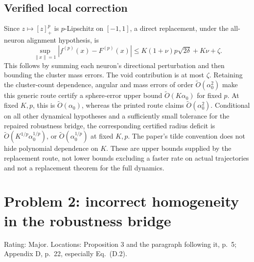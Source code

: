 \documentclass[10pt]{article}
\begin{document}
\subsection*{Verified local correction}
Since \(z\mapsto[z]_+^p\) is \(p\)-Lipschitz on \([-1,1]\), a direct replacement, under the all-neuron alignment hypothesis, is \[\sup_{\|x\|=1}|f^{(p)}(x)-F^{(p)}(x)|
 \le K(1+\nu)p\sqrt{2\delta}+K\nu+\zeta. \tag{R2}\] This follows by summing each neuron’s directional perturbation and then bounding the cluster mass errors. The void contribution is at most \(\zeta\). Retaining the cluster-count dependence, angular and mass errors of order \(\widetilde O(\alpha_0^2)\) make this generic route certify a sphere-error upper bound \(\widetilde O(K\alpha_0)\) for fixed \(p\). At fixed \(K,p\), this is \(\widetilde O(\alpha_0)\), whereas the printed route claims \(\widetilde O(\alpha_0^2)\). Conditional on all other dynamical hypotheses and a sufficiently small tolerance for the repaired robustness bridge, the corresponding certified radius deficit is \(\widetilde O(K^{1/p}\alpha_0^{1/p})\), or \(\widetilde O(\alpha_0^{1/p})\) at fixed \(K,p\). The paper’s tilde convention does not hide polynomial dependence on \(K\). These are upper bounds supplied by the replacement route, not lower bounds excluding a faster rate on actual trajectories and not a replacement theorem for the full dynamics.\par
\section*{Problem 2: incorrect homogeneity in the robustness bridge}
Rating: Major. Locations: Proposition 3 and the paragraph following it, p. 5; Appendix D, p. 22, especially Eq. (D.2).\par
\end{document}
